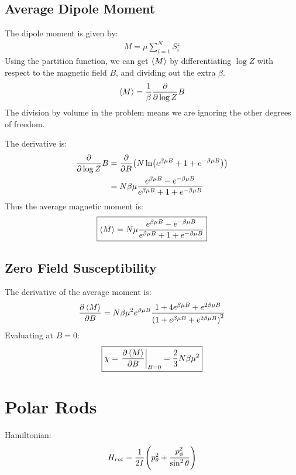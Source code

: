 \documentclass[12pt]{article}
\begin{document}
\subsection{Average Dipole Moment}
The dipole moment is given by:
\begin{align*}
  M=\mu\sum_{i=1}^NS_i^z
\end{align*}
Using the partition function, we can get $\ev{M}$ by differentiating $\log Z$ with respect to the magnetic field $B$, and dividing out the extra $\beta$.
\begin{align*}
  \ev{M}=\frac1\beta\pdv{\log Z}B
\end{align*}
The division by volume in the problem means we are ignoring the other degrees of freedom.

The derivative is:
\begin{align*}
  \pdv{\log Z}B&=\pdv{B}\qty(N\ln(e^{\beta\mu B}+1+e^{-\beta\mu B}))\\
  &=N\beta\mu\frac{e^{\beta\mu B}-e^{-\beta\mu B}}
  {e^{\beta\mu B}+1+e^{-\beta\mu B}}
\end{align*}
Thus the average magnetic moment is:
\begin{align}
  \boxed{\ev{M}=
    N\mu\frac{e^{\beta\mu B}-e^{-\beta\mu B}}
    {e^{\beta\mu B}+1+e^{-\beta\mu B}}}
\end{align}
\subsection{Zero Field Susceptibility}
The derivative of the average moment is:
\begin{align*}
  \pdv{\ev{M}}{B}=N\beta\mu^2e^{\beta\mu B}
  \frac{1+4e^{\beta\mu B}+e^{2\beta\mu B}}
  {\qty(1+e^{\beta\mu B}+e^{2\beta\mu B})^2}
\end{align*}
Evaluating at $B=0$:
\begin{align}
  \boxed{\chi=\eval{\pdv{\ev{M}}{B}}_{B=0}=\frac23N\beta\mu^2}
\end{align}
\section{Polar Rods}
Hamiltonian:
\begin{align*}
  H_{rot}=\frac1{2I}\qty(p_\theta^2+\frac{p_\phi^2}{\sin^2\theta})
\end{align*}
\end{document}
